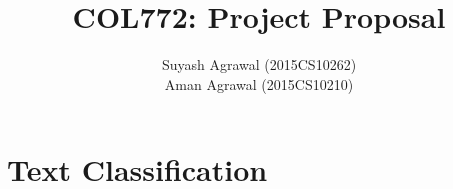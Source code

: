 \documentclass[12pt,a4paper]{article}
\title{COL772: Project Proposal}
\author{Suyash Agrawal (2015CS10262) \\ Aman Agrawal (2015CS10210)}
\begin{document}
\maketitle
\section{Text Classification}
    
    
\end{document}
